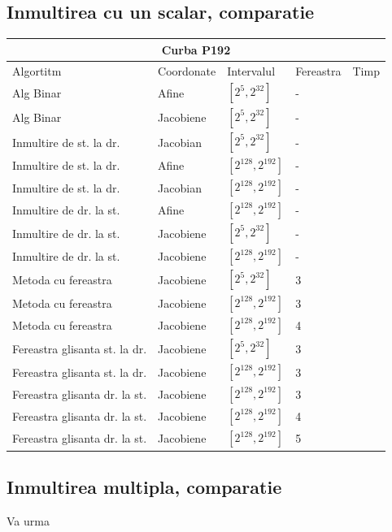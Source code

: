 \subsection{Inmultirea cu un scalar, comparatie}
\label{subsec:subsec03}
\begin{tabular}{ |p{5cm}||p{3cm}|p{3cm}|p{2cm}|p{1cm}|  }
 \hline
 \multicolumn{5}{|c|}{Curba P192} \\
 \hline
 Algortitm& Coordonate &Intervalul &Fereastra &Timp\\
 \hline
 Alg Binar & Afine  &$[2^{5},2^{32}]$& -\\
 Alg Binar&Jacobiene  & $[2^{5},2^{32}]$ & -\\
 Inmultire de st. la dr. & Jacobian & $[2^{5},2^{32}]$& -\\
 Inmultire de st. la dr. & Afine & $[2^{128},2^{192}]$& -\\
 Inmultire de st. la dr. & Jacobian & $[2^{128},2^{192}]$& -\\
 Inmultire de dr. la st. &Afine & $[2^{128},2^{192}]$ & -\\
 Inmultire de dr. la st. &Jacobiene & $[2^{5},2^{32}]$ & -\\
 Inmultire de dr. la st. &Jacobiene & $[2^{128},2^{192}]$ & -\\
 Metoda cu fereastra& Jacobiene & $[2^{5},2^{32}]$ & 3\\
 Metoda cu fereastra& Jacobiene & $[2^{128},2^{192}]$ & 3\\
 Metoda cu fereastra& Jacobiene & $[2^{128},2^{192}]$ & 4\\
 Fereastra glisanta st. la dr.& Jacobiene  & $[2^{5},2^{32}]$& 3\\
 Fereastra glisanta st. la dr.& Jacobiene  & $[2^{128},2^{192}]$& 3\\
 Fereastra glisanta dr. la st.& Jacobiene  & $[2^{128},2^{192}]$& 3\\
 Fereastra glisanta dr. la st.& Jacobiene  & $[2^{128},2^{192}]$& 4\\
 Fereastra glisanta dr. la st.& Jacobiene  & $[2^{128},2^{192}]$& 5\\
 \hline
\end{tabular}
\subsection{Inmultirea multipla, comparatie}
\label{subsec:subsec04}
Va urma



